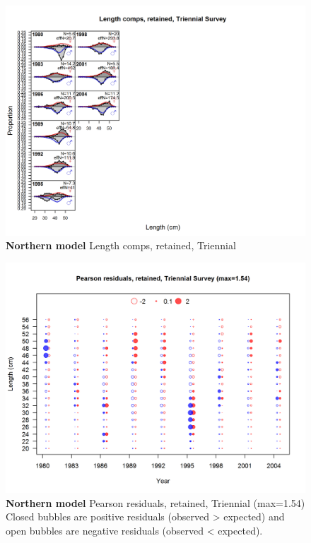 \documentclass[12pt,]{article}
\begin{document}
\begin{figure}[htbp]
\centering
\includegraphics{./r4ss/plots_mod1/comp_lenfit_flt5mkt2.png}
\caption{\textbf{Northern model} Length comps, retained, Triennial
\label{fig:mod1_22_comp_lenfit_flt5mkt2}}
\end{figure}

\begin{figure}[htbp]
\centering
\includegraphics{./r4ss/plots_mod1/comp_lenfit_residsflt5mkt2.png}
\caption{\textbf{Northern model} Pearson residuals, retained, Triennial
(max=1.54)\\
Closed bubbles are positive residuals (observed \textgreater{} expected)
and open bubbles are negative residuals (observed \textless{} expected).
\label{fig:mod1_23_comp_lenfit_residsflt5mkt2}}
\end{figure}
\end{document}
